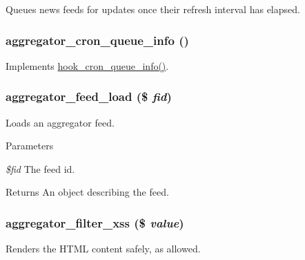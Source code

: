 Queues news feeds for updates once their refresh interval has elapsed. \hypertarget{aggregator_8module_a3090186480044070e50c5682806980ad}{
\subsubsection[{aggregator\_\-cron\_\-queue\_\-info}]{\setlength{\rightskip}{0pt plus 5cm}aggregator\_\-cron\_\-queue\_\-info ()}}
\label{aggregator_8module_a3090186480044070e50c5682806980ad}
Implements \hyperlink{group__hooks_gae161ed78fd5e8775ffc9264346a64320}{hook\_\-cron\_\-queue\_\-info()}. \hypertarget{aggregator_8module_a75d55b29c2e341452a7f4ff981f58b08}{
\subsubsection[{aggregator\_\-feed\_\-load}]{\setlength{\rightskip}{0pt plus 5cm}aggregator\_\-feed\_\-load (\$ {\em fid})}}
\label{aggregator_8module_a75d55b29c2e341452a7f4ff981f58b08}
Loads an aggregator feed.


\begin{DoxyParams}{Parameters}
\item[{\em \$fid}]The feed id.\end{DoxyParams}
\begin{DoxyReturn}{Returns}
An object describing the feed. 
\end{DoxyReturn}
\hypertarget{aggregator_8module_aeae59ae915eb52b6750932dabfbdf236}{
\subsubsection[{aggregator\_\-filter\_\-xss}]{\setlength{\rightskip}{0pt plus 5cm}aggregator\_\-filter\_\-xss (\$ {\em value})}}
\label{aggregator_8module_aeae59ae915eb52b6750932dabfbdf236}
Renders the HTML content safely, as allowed.


